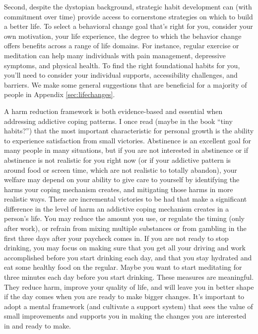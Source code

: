 \documentclass[12pt,letterpaper]{book}
\begin{document}
Second, despite the dystopian background, strategic habit development can (with commitment over time) provide access to cornerstone strategies on which to build a better life. To select a behavioral change goal that's right for you, consider your own motivation, your life experience, the degree to which the behavior change offers benefits across a range of life domains. For instance, regular exercise or meditation can help many individuals with pain management, depressive symptoms, and physical health. To find the right foundational habits for you, you'll need to consider your individual supports, accessibility challenges, and barriers. We make some general suggestions that are beneficial for a majority of people in Appendix \ref{sec:lifechanges}.

A harm reduction framework is both evidence-based and essential when addressing addictive coping patterns. I once read (maybe in the book “tiny habits?”) that the most important characteristic for personal growth is the ability to experience satisfaction from small victories. Abstinence is an excellent goal for many people in many situations, but if you are not interested in abstinence or if abstinence is not realistic for you right now (or if your addictive pattern is around food or screen time, which are not realistic to totally abandon), your welfare may depend on your ability to give care to yourself by identifying the harms your coping mechanism creates, and mitigating those harms in more realistic ways. There are incremental victories to be had that make a significant difference in the level of harm an addictive coping mechanism creates in a person's life. You may reduce the amount you use, or regulate the timing (only after work), or refrain from mixing multiple substances or from gambling in the first three days after your paycheck comes in. If you are not ready to stop drinking, you may focus on making sure that you get all your driving and work accomplished before you start drinking each day, and that you stay hydrated and eat some healthy food on the regular. Maybe you want to start meditating for three minutes each day before you start drinking. These measures are meaningful. They reduce harm, improve your quality of life, and will leave you in better shape if the day comes when you are ready to make bigger changes. It's important to adopt a mental framework (and cultivate a support system) that sees the value of small improvements and supports you in making the changes you are interested in and ready to make.
\end{document}
